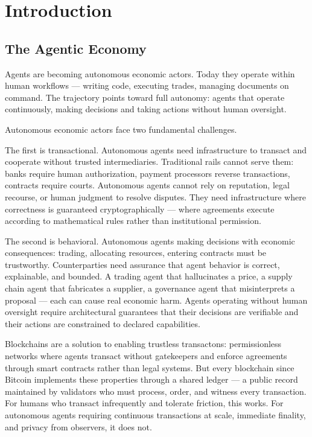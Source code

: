 \documentclass{article}
\begin{document}
\clearpage
\setlength{\cftbeforesecskip}{3pt}
\tableofcontents
\clearpage

\section*{Introduction}

\subsection*{The Agentic Economy}

Agents are becoming autonomous economic actors. Today they operate within human workflows --- writing code, executing trades, managing documents on command. The trajectory points toward full autonomy: agents that operate continuously, making decisions and taking actions without human oversight.

\medskip

Autonomous economic actors face two fundamental challenges.

\medskip

The first is transactional. Autonomous agents need infrastructure to transact and cooperate without trusted intermediaries. Traditional rails cannot serve them: banks require human authorization, payment processors reverse transactions, contracts require courts. Autonomous agents cannot rely on reputation, legal recourse, or human judgment to resolve disputes. They need infrastructure where correctness is guaranteed cryptographically --- where agreements execute according to mathematical rules rather than institutional permission.

\medskip

The second is behavioral. Autonomous agents making decisions with economic consequences: trading, allocating resources, entering contracts must be trustworthy. Counterparties need assurance that agent behavior is correct, explainable, and bounded. A trading agent that hallucinates a price, a supply chain agent that fabricates a supplier, a governance agent that misinterprets a proposal --- each can cause real economic harm. Agents operating without human oversight require architectural guarantees that their decisions are verifiable and their actions are constrained to declared capabilities.

\medskip

Blockchains are a solution to enabling trustless transactons: permissionless networks where agents transact without gatekeepers and enforce agreements through smart contracts rather than legal systems. But every blockchain since Bitcoin implements these properties through a shared ledger --- a public record maintained by validators who must process, order, and witness every transaction. For humans who transact infrequently and tolerate friction, this works. For autonomous agents requiring continuous transactions at scale, immediate finality, and privacy from observers, it does not.
\end{document}
